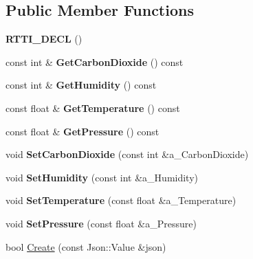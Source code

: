 \subsection*{Public Member Functions}
\begin{DoxyCompactItemize}
\item 
\mbox{\label{class_environment_a5129bc938599c31f0471ccd4b2e065f2}} 
{\bfseries R\+T\+T\+I\+\_\+\+D\+E\+CL} ()
\item 
\mbox{\label{class_environment_aa25092a73326ea28d175fe7e9e63dfb2}} 
const int \& {\bfseries Get\+Carbon\+Dioxide} () const
\item 
\mbox{\label{class_environment_a0c37e68c4dbb1165c569610abd4d3001}} 
const int \& {\bfseries Get\+Humidity} () const
\item 
\mbox{\label{class_environment_a617b45e74b14d60fc67c58c5545d92c0}} 
const float \& {\bfseries Get\+Temperature} () const
\item 
\mbox{\label{class_environment_ac2efbab6db1444c9e778356d71b07093}} 
const float \& {\bfseries Get\+Pressure} () const
\item 
\mbox{\label{class_environment_a3f0a159e23a307abf67c55aae968676b}} 
void {\bfseries Set\+Carbon\+Dioxide} (const int \&a\+\_\+\+Carbon\+Dioxide)
\item 
\mbox{\label{class_environment_a90195dc8013a17d812dd5f2d196b675f}} 
void {\bfseries Set\+Humidity} (const int \&a\+\_\+\+Humidity)
\item 
\mbox{\label{class_environment_acd735f2cc81c89b5577cd505f9581041}} 
void {\bfseries Set\+Temperature} (const float \&a\+\_\+\+Temperature)
\item 
\mbox{\label{class_environment_a5fd108e8eb46a4064c9f0fb1e9081378}} 
void {\bfseries Set\+Pressure} (const float \&a\+\_\+\+Pressure)
\item 
\mbox{\label{class_environment_a224cbba6df23fc2dc519642cec1324a6}} 
bool \hyperlink{class_environment_a224cbba6df23fc2dc519642cec1324a6}{Create} (const Json\+::\+Value \&json)

\end{DoxyCompactItemize}
